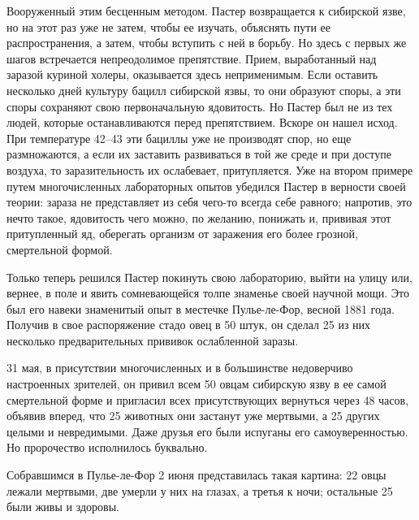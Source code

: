 Вооруженный этим  бесценным  методом. Пастер  возвращается  к  сибирской
язве, но на этот раз уже не  затем, чтобы ее изучать, объяснять пути  ее
распространения, а затем,  чтобы вступить  с ней  в борьбу.  Но здесь  с
первых  же   шагов   встречается   непреодолимое   препятствие.   Прием,
выработанный над заразой куриной холеры, оказывается здесь неприменимым.
Если оставить  несколько дней  культуру бацилл  сибирской язвы,  то  они
образуют споры, а эти споры сохраняют свою первоначальную ядовитость. Но
Пастер был не из тех людей, которые останавливаются перед  препятствием.
Вскоре он  нашел  исход.  При  температуре 42--43  эти  бациллы  уже  не
производят спор, но еще размножаются, а если их заставить развиваться  в
той же среде и  при доступе воздуха,  то заразительность их  ослабевает,
притупляется. Уже на  втором примере  путем многочисленных  лабораторных
опытов убедился Пастер в верности  своей теории: зараза не  представляет
из  себя  чего-то  всегда  себе  равного;  напротив,  это  нечто  такое,
ядовитость  чего   можно,  по   желанию,  понижать   и,  прививая   этот
притупленный яд,  оберегать организм  от  заражения его  более  грозной,
смертельной формой.

Только теперь решился Пастер покинуть  свою лабораторию, выйти на  улицу
или, вернее, в поле и  явить сомневающейся толпе знаменье своей  научной
мощи. Это был его навеки знаменитый опыт в местечке Пулье-ле-Фор, весной
1881 года. Получив в свое распоряжение  стадо овец в 50 штук, он  сделал
25 из них несколько предварительных прививок ослабленной заразы.

31  мая,  в  присутствии  многочисленных  и  в  большинстве  недоверчиво
настроенных зрителей, он привил всем 50 овцам сибирскую язву в ее  самой
смертельной форме  и пригласил  всех присутствующих  вернуться через  48
часов, объявив вперед, что 25 животных  они застанут уже мертвыми, а  25
других  целыми  и  невредимыми.  Даже  друзья  его  были  испуганы   его
самоуверенностью. Но пророчество исполнилось буквально.

Собравшимся в Пулье-ле-Фор 2 июня  представилась такая картина: 22  овцы
лежали мертвыми, две умерли у них на глазах, а третья к ночи;  остальные
25 были живы и здоровы.

